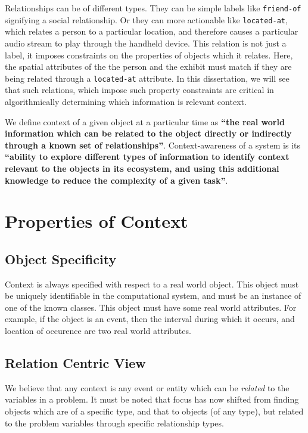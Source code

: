 Relationships can be of different types. They can be simple labels like \texttt{friend-of} signifying a social relationship. Or they can more actionable like \texttt{located-at}, which relates a person to a particular location, and therefore causes a particular audio stream to play through the handheld device. This relation is not just a label, it imposes constraints on the properties of objects which it relates. Here, the spatial attributes of the the person and the exhibit must match if they are being related through a \texttt{located-at} attribute. In this dissertation, we will see that such relations, which impose such property constraints are critical in algorithmically determining which information is relevant context.

We define context of a given object at a particular time as \textbf{``the real world information which can be related to the object directly or indirectly through a known set of relationships''}. Context-awareness of a system is its \textbf{``ability to explore different types of information to identify context relevant to the objects in its ecosystem, and using this additional knowledge to reduce the complexity of a given task''}.

\section{Properties of Context}

\subsection{Object Specificity}
Context is always specified with respect to a real world object. This object must be uniquely identifiable in the computational system, and must be an instance of one of the known classes. This object must have some real world attributes. For example, if the object is an event, then the interval during which it occurs, and location of occurence are two real world attributes.

\subsection{Relation Centric View}
We believe that any context is any event or entity which can be \textit{related} to the variables in a problem. It must be noted that focus has now shifted from finding objects which are of a specific type, and that to objects (of any type), but related to the problem variables through specific relationship types.

